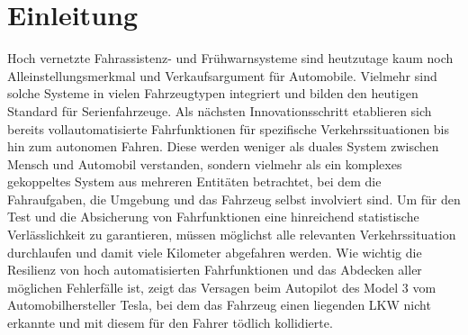\section{Einleitung}
Hoch vernetzte Fahrassistenz- und Frühwarnsysteme sind heutzutage kaum noch Alleinstellungsmerkmal und Verkaufsargument 
für Automobile. Vielmehr sind solche Systeme in vielen Fahrzeugtypen integriert und bilden den heutigen Standard für 
Serienfahrzeuge. Als nächsten Innovationsschritt etablieren sich bereits vollautomatisierte Fahrfunktionen für 
spezifische Verkehrssituationen bis hin zum autonomen Fahren. Diese werden weniger als duales System zwischen Mensch 
und Automobil verstanden, sondern vielmehr als ein komplexes gekoppeltes System aus mehreren Entitäten betrachtet, bei 
dem die Fahraufgaben, die Umgebung und das Fahrzeug selbst involviert sind. 
Um für den Test und die Absicherung von Fahrfunktionen eine hinreichend statistische Verlässlichkeit zu garantieren, 
müssen möglichst alle relevanten Verkehrssituation durchlaufen und damit viele Kilometer abgefahren werden. Wie wichtig 
die Resilienz von hoch automatisierten Fahrfunktionen und das Abdecken aller möglichen Fehlerfälle ist, 
zeigt das Versagen beim Autopilot des Model 3 vom Automobilhersteller Tesla, bei dem das Fahrzeug einen liegenden LKW 
nicht erkannte und mit diesem für den Fahrer tödlich kollidierte.



